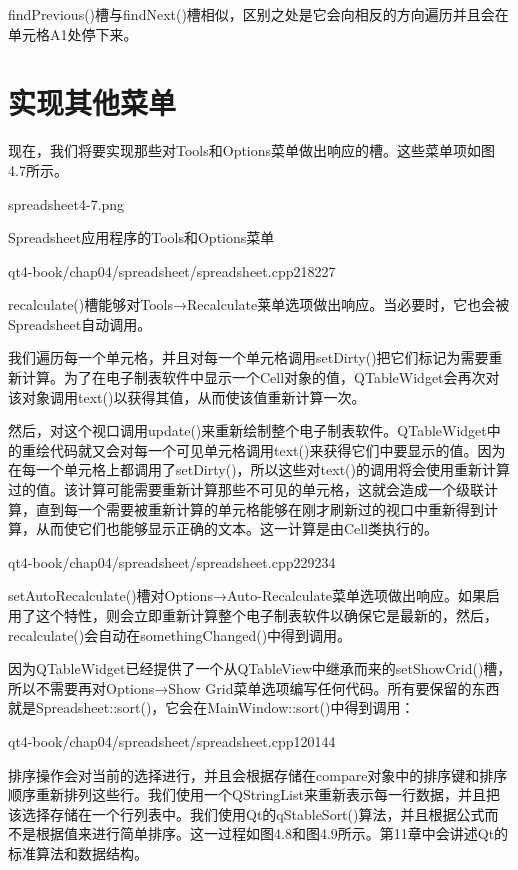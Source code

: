 \documentclass[11pt,oneside]{book}
\begin{document}
\begin{common-format}
findPrevious()槽与findNext()槽相似，区别之处是它会向相反的方向遍历并且会在单元格A1处停下来。


\section{实现其他菜单}
现在，我们将要实现那些对Tools和Options菜单做出响应的槽。这些菜单项如图4.7所示。
\begin{fig}{spreadsheet4-7.png}
\caption{Spreadsheet应用程序的Tools和Options菜单}
\label{fig:spreadsheet4-7.png}
\end{fig}

\begin{cppline}{qt4-book/chap04/spreadsheet/spreadsheet.cpp}{218}{227}
\end{cppline}

recalculate()槽能够对Tools→Recalculate莱单选项做出响应。当必要时，它也会被Spreadsheet自动调用。  

我们遍历每一个单元格，并且对每一个单元格调用setDirty()把它们标记为需要重新计算。为了在电子制表软件中显示一个Cell对象的值，QTableWidget会再次对该对象调用text()以获得其值，从而使该值重新计算一次。

然后，对这个视口调用update()来重新绘制整个电子制表软件。QTableWidget中的重绘代码就又会对每一个可见单元格调用text()来获得它们中要显示的值。因为在每一个单元格上都调用了setDirty()，所以这些对text()的调用将会使用重新计算过的值。该计算可能需要重新计算那些不可见的单元格，这就会造成一个级联计算，直到每一个需要被重新计算的单元格能够在刚才刷新过的视口中重新得到计算，从而使它们也能够显示正确的文本。这一计算是由Cell类执行的。

\begin{cppline}{qt4-book/chap04/spreadsheet/spreadsheet.cpp}{229}{234}
\end{cppline}

setAutoRecalculate()槽对Options→Auto-Recalculate菜单选项做出响应。如果启用了这个特性，则会立即重新计算整个电子制表软件以确保它是最新的，然后，recalculate()会自动在somethingChanged()中得到调用。

因为QTableWidget已经提供了一个从QTableView中继承而来的setShowCrid()槽，所以不需要再对Options→Show Grid菜单选项编写任何代码。所有要保留的东西就是Spreadsheet::sort()，它会在MainWindow::sort()中得到调用：

\begin{cppline}{qt4-book/chap04/spreadsheet/spreadsheet.cpp}{120}{144}
\end{cppline}
 
排序操作会对当前的选择进行，并且会根据存储在compare对象中的排序键和排序顺序重新排列这些行。我们使用一个QStringList来重新表示每一行数据，并且把该选择存储在一个行列表中。我们使用Qt的qStableSort()算法，并且根据公式而不是根据值来进行简单排序。这一过程如图4.8和图4.9所示。第11章中会讲述Qt的标准算法和数据结构。


\end{common-format}
\end{document}
